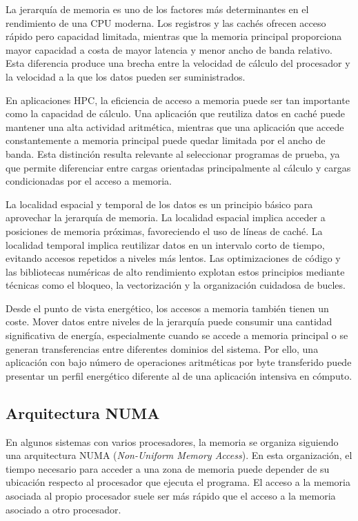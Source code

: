 La jerarquía de memoria es uno de los factores más determinantes en el rendimiento de una CPU moderna. Los registros y las cachés ofrecen acceso rápido pero capacidad limitada, mientras que la memoria principal proporciona mayor capacidad a costa de mayor latencia y menor ancho de banda relativo. Esta diferencia produce una brecha entre la velocidad de cálculo del procesador y la velocidad a la que los datos pueden ser suministrados.

En aplicaciones HPC, la eficiencia de acceso a memoria puede ser tan importante como la capacidad de cálculo. Una aplicación que reutiliza datos en caché puede mantener una alta actividad aritmética, mientras que una aplicación que accede constantemente a memoria principal puede quedar limitada por el ancho de banda. Esta distinción resulta relevante al seleccionar programas de prueba, ya que permite diferenciar entre cargas orientadas principalmente al cálculo y cargas condicionadas por el acceso a memoria.

La localidad espacial y temporal de los datos es un principio básico para aprovechar la jerarquía de memoria. La localidad espacial implica acceder a posiciones de memoria próximas, favoreciendo el uso de líneas de caché. La localidad temporal implica reutilizar datos en un intervalo corto de tiempo, evitando accesos repetidos a niveles más lentos. Las optimizaciones de código y las bibliotecas numéricas de alto rendimiento explotan estos principios mediante técnicas como el bloqueo, la vectorización y la organización cuidadosa de bucles.

Desde el punto de vista energético, los accesos a memoria también tienen un coste. Mover datos entre niveles de la jerarquía puede consumir una cantidad significativa de energía, especialmente cuando se accede a memoria principal o se generan transferencias entre diferentes dominios del sistema. Por ello, una aplicación con bajo número de operaciones aritméticas por byte transferido puede presentar un perfil energético diferente al de una aplicación intensiva en cómputo.

\subsection{Arquitectura NUMA}

En algunos sistemas con varios procesadores, la memoria se organiza siguiendo una arquitectura NUMA (\emph{Non-Uniform Memory Access}). En esta organización, el tiempo necesario para acceder a una zona de memoria puede depender de su ubicación respecto al procesador que ejecuta el programa. El acceso a la memoria asociada al propio procesador suele ser más rápido que el acceso a la memoria asociado a otro procesador.

